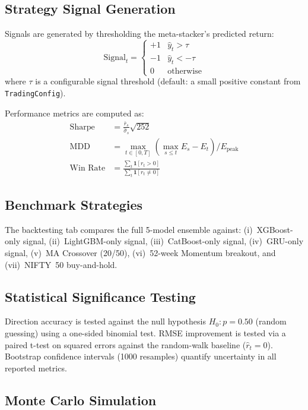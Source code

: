 \documentclass[10pt,a4paper,twoside]{article}
\begin{document}
\subsection{Strategy Signal Generation}

Signals are generated by thresholding the meta-stacker's predicted return:
\begin{equation}
  \text{Signal}_t = \begin{cases}
    +1 & \hat{y}_t > \tau \\
    -1 & \hat{y}_t < -\tau \\
     0 & \text{otherwise}
  \end{cases}
\end{equation}
where $\tau$ is a configurable signal threshold (default: a small positive
constant from \texttt{TradingConfig}).

Performance metrics are computed as:
\begin{align}
  \text{Sharpe} &= \frac{\bar{r}_s}{\hat{\sigma}_s}\sqrt{252} \\
  \text{MDD} &= \max_{t \in [0,T]}\left(\max_{s \leq t} E_s - E_t\right) / E_{\text{peak}} \\
  \text{Win Rate} &= \frac{\sum_t \mathbf{1}[r_t > 0]}{\sum_t \mathbf{1}[r_t \neq 0]}
\end{align}

\subsection{Benchmark Strategies}

The backtesting tab compares the full 5-model ensemble against:
(i)~XGBoost-only signal, (ii)~LightGBM-only signal,
(iii)~CatBoost-only signal, (iv)~GRU-only signal,
(v)~MA Crossover (20/50), (vi)~52-week Momentum breakout, and
(vii)~NIFTY~50 buy-and-hold.

\subsection{Statistical Significance Testing}

Direction accuracy is tested against the null hypothesis $H_0: p = 0.50$
(random guessing) using a one-sided binomial test. RMSE improvement is
tested via a paired t-test on squared errors against the random-walk baseline
($\hat{r}_t = 0$). Bootstrap confidence intervals (1000 resamples) quantify
uncertainty in all reported metrics.

\subsection{Monte Carlo Simulation}
\end{document}
